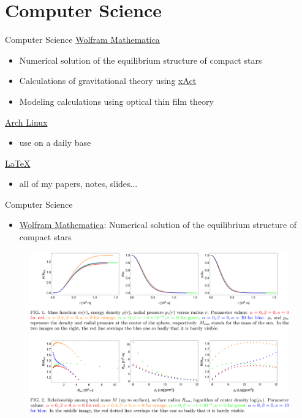 \documentclass[9pt,aspectratio=169,hyperref=colorlinks]{beamer}
\begin{document}
\section{Computer Science}
\begin{frame}{Computer Science}
    \href{https://www.wolfram.com/mathematica/}{Wolfram Mathematica}
    \begin{itemize}
        \item Numerical solution of the equilibrium structure of compact stars
        \item Calculations of gravitational theory using \href{http://xact.es/index.html}{xAct}
        \item Modeling calculations using optical thin film theory
    \end{itemize}
    
    \href{https://archlinux.org}{Arch Linux}
    \begin{itemize}
        \item use on a daily base
    \end{itemize}
    
    \href{https://www.latex-project.org}{\LaTeX}
    \begin{itemize}
        \item all of my papers, notes, slides...
    \end{itemize}
\end{frame}

\begin{frame}{Computer Science}
    \begin{itemize}
        \item \href{https://www.wolfram.com/mathematica/}{Wolfram Mathematica}: Numerical solution of the equilibrium structure of compact stars
    \end{itemize}

    \begin{figure}
        \centering
        \includegraphics[scale=0.2]{CV/figs/2210.01574.png}
    \end{figure}
\end{frame}
\end{document}
